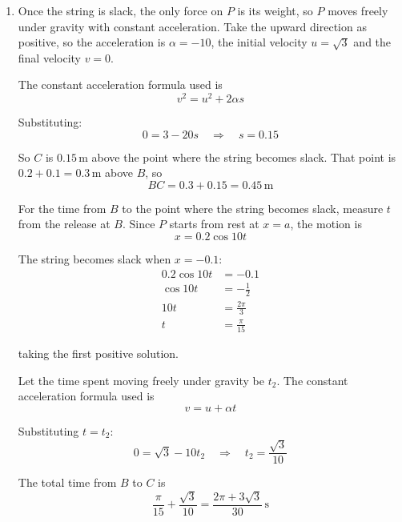 \documentclass[leqno]{article}
\begin{document}
\begin{enumerate}[
  label=\textbf{\arabic*.},
  leftmargin=*,
  topsep=0pt,
  partopsep=0pt,
  parsep=0pt
]
\begin{djsSolution}
\begin{enumerate}[label=\textbf{(\alph*)}, start=1]
\item Once the string is slack, the only force on \(P\) is its weight, so \(P\) moves freely under gravity with constant acceleration. Take the upward direction as positive, so the acceleration is \(\alpha=-10\), the initial velocity \(u=\sqrt{3}\) and the final velocity \(v=0\).

The constant acceleration formula used is
\[
v^2=u^2+2\alpha s
\]

Substituting:
\[
0=3-20s\quad\Longrightarrow\quad s=0.15
\]

So \(C\) is \(0.15\,\mathrm{m}\) above the point where the string becomes slack. That point is \(0.2+0.1=0.3\,\mathrm{m}\) above \(B\), so
\[
BC=0.3+0.15=0.45\,\mathrm{m}
\]

For the time from \(B\) to the point where the string becomes slack, measure \(t\) from the release at \(B\). Since \(P\) starts from rest at \(x=a\), the motion is
\[
x=0.2\cos 10t
\]

The string becomes slack when \(x=-0.1\):
\begin{align*}
0.2\cos 10t&=-0.1\\
\cos 10t&=-\frac{1}{2}\\
10t&=\frac{2\pi}{3}\\
t&=\frac{\pi}{15}
\end{align*}

taking the first positive solution.

Let the time spent moving freely under gravity be \(t_2\). The constant acceleration formula used is
\[
v=u+\alpha t
\]

Substituting \(t=t_2\):
\[
0=\sqrt{3}-10t_2\quad\Longrightarrow\quad t_2=\frac{\sqrt{3}}{10}
\]

The total time from \(B\) to \(C\) is
\[
\frac{\pi}{15}+\frac{\sqrt{3}}{10}=\frac{2\pi+3\sqrt{3}}{30}\,\mathrm{s}
\]
\end{enumerate}
\end{djsSolution}

\newpage

\questionitem

\begin{figure}[H]
    \centering
{}
\end{figure}
\end{enumerate}
\end{document}
